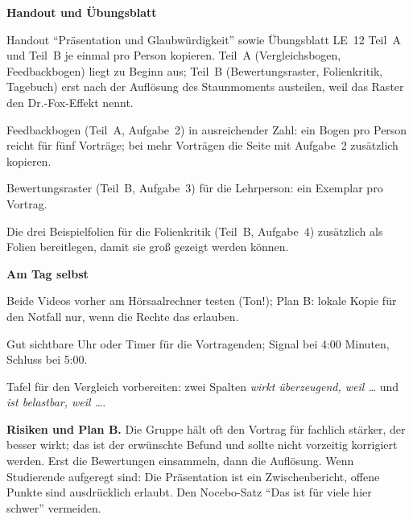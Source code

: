 \begin{vorbereitung}
\textbf{Handout und Übungsblatt}
\begin{checkliste}
  \item Handout \enquote{Präsentation und Glaubwürdigkeit} sowie
    Übungsblatt LE~12 Teil~A und Teil~B je einmal pro Person kopieren.
    Teil~A (Vergleichsbogen, Feedbackbogen) liegt zu Beginn aus; Teil~B
    (Bewertungsraster, Folienkritik, Tagebuch) erst nach der Auflösung
    des Staunmoments austeilen, weil das Raster den Dr.-Fox-Effekt nennt.
  \item Feedbackbogen (Teil~A, Aufgabe~2) in ausreichender Zahl: ein
    Bogen pro Person reicht für fünf Vorträge; bei mehr Vorträgen die
    Seite mit Aufgabe~2 zusätzlich kopieren.
  \item Bewertungsraster (Teil~B, Aufgabe~3) für die Lehrperson: ein
    Exemplar pro Vortrag.
  \item Die drei Beispielfolien für die Folienkritik (Teil~B, Aufgabe~4)
    zusätzlich als Folien bereitlegen, damit sie groß gezeigt werden
    können.
\end{checkliste}

\textbf{Am Tag selbst}
\begin{checkliste}
  \item Beide Videos vorher am Hörsaalrechner testen (Ton!); Plan B: lokale
    Kopie für den Notfall nur, wenn die Rechte das erlauben.
  \item Gut sichtbare Uhr oder Timer für die Vortragenden; Signal bei
    4:00 Minuten, Schluss bei 5:00.
  \item Tafel für den Vergleich vorbereiten: zwei Spalten
    \emph{wirkt überzeugend, weil \ldots} und \emph{ist belastbar, weil
    \ldots}.
\end{checkliste}

\textbf{Risiken und Plan B.} Die Gruppe hält oft den Vortrag für fachlich
stärker, der besser wirkt; das ist der erwünschte Befund und sollte nicht
vorzeitig korrigiert werden. Erst die Bewertungen einsammeln, dann die
Auflösung. Wenn Studierende aufgeregt sind: Die Präsentation ist ein
Zwischenbericht, offene Punkte sind ausdrücklich erlaubt. Den
Nocebo-Satz \enquote{Das ist für viele hier schwer} vermeiden.
\end{vorbereitung}

